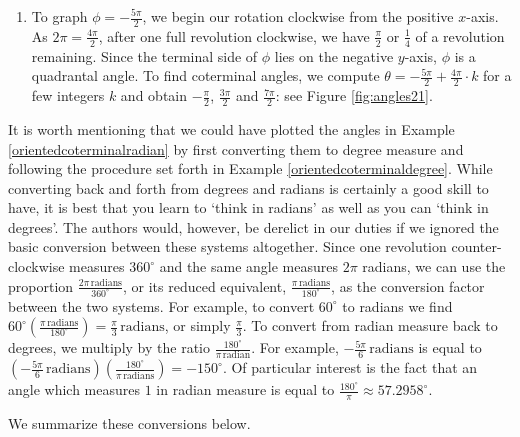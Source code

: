 {\begin{enumerate}
\item  To graph  $\phi = -\frac{5 \pi}{2}$, we begin our rotation clockwise from the positive $x$-axis.  As  $2 \pi = \frac{4 \pi}{2}$, after one full revolution clockwise, we have  $\frac{\pi}{2}$ or $\frac{1}{4}$ of a revolution remaining.  Since the terminal side of $\phi$ lies on the negative $y$-axis, $\phi$ is a quadrantal angle.  To find coterminal angles, we compute $\theta = -\frac{5 \pi}{2} +   \frac{4 \pi}{2} \cdot k$ for a few integers $k$ and obtain $-\frac{\pi}{2}$, $\frac{3 \pi}{2}$ and $\frac{7 \pi}{2}$: see Figure \ref{fig:angles21}.  


\end{enumerate}
}

\medskip

It is worth mentioning that we could have plotted the angles in Example \ref{orientedcoterminalradian} by first converting them to degree measure and following the procedure set forth in Example \ref{orientedcoterminaldegree}.  While converting back and forth from degrees and radians is certainly a good skill to have, it is best that you learn to `think in radians' as well as you can `think in degrees'.  The authors would, however, be derelict in our duties if we ignored the basic conversion between these systems altogether.  Since one revolution counter-clockwise measures $360^{\circ}$ and the same angle measures $2 \pi$ radians, we can use the proportion $\frac{2 \pi \, \text{radians}}{360^{\circ}}$, or its reduced equivalent, $\frac{\pi \, \text{radians}}{180^{\circ}}$, as the conversion factor between the two systems.  For example, to convert $60^{\circ}$ to radians we find $60^{\circ} \left( \frac{\pi \, \text{radians}}{180^{\circ}}\right) = \frac{\pi}{3} \, \text{radians}$, or simply $\frac{\pi}{3}$.  To convert from radian measure back to degrees, we multiply by the ratio $\frac{180^{\circ}}{\pi \, \text{radian}}$.  For example,  $-\frac{5 \pi}{6} \, \text{radians}$ is equal to $\left(-\frac{5 \pi}{6} \, \text{radians} \right) \left( \frac{180^{\circ}}{\pi \, \text{radians}}\right) = -150^{\circ}$.  Of particular interest is the fact that an angle which measures $1$ in radian measure is equal to $\frac{180^{\circ}}{\pi}  \approx 57.2958^{\circ}$.  

We summarize these conversions below.

\bigskip

